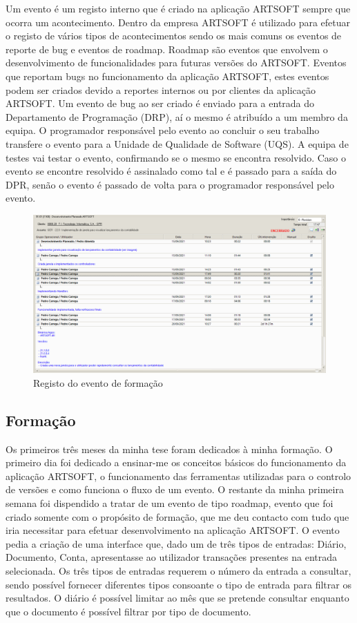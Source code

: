 \documentclass[sigplan]{acmart}
\begin{document}
Um evento é um registo interno que é criado na aplicação ARTSOFT sempre que ocorra um acontecimento. Dentro da empresa ARTSOFT é utilizado para efetuar o registo de vários tipos de acontecimentos sendo os mais comuns os eventos de reporte de bug e eventos de roadmap. Roadmap são eventos que envolvem o desenvolvimento de funcionalidades para futuras versões do ARTSOFT. Eventos que reportam bugs no funcionamento da aplicação ARTSOFT, estes eventos podem ser criados devido a reportes internos ou por clientes da aplicação ARTSOFT. Um evento de bug ao ser criado é enviado para a entrada do Departamento de Programação (DRP), aí o mesmo é atribuído a um membro da equipa. O programador responsável pelo evento ao concluir o seu trabalho transfere o evento para a Unidade de Qualidade de Software (UQS). A equipa de testes vai testar o evento, confirmando se o mesmo se encontra resolvido. Caso o evento se encontre resolvido é assinalado como tal e é passado para a saída do DPR, senão o evento é passado de volta para o programador responsável pelo evento.

\begin{figure}[htbp]
	\centerline{\includegraphics[width=\linewidth]{figures/evento_formacao.png}}
	\caption{Registo do evento de formação}
	\label{fig1}
\end{figure}

\subsection{Formação}

Os primeiros três meses da minha tese foram dedicados à minha formação. O primeiro dia foi dedicado a ensinar-me os conceitos básicos do funcionamento da aplicação ARTSOFT, o funcionamento das ferramentas utilizadas para o controlo de versões e como funciona o fluxo de um evento. O restante da minha primeira semana foi dispendido a tratar de um evento de tipo roadmap, evento que foi criado somente com o propósito de formação, que me deu contacto com tudo que iria necessitar para efetuar desenvolvimento na aplicação ARTSOFT. O evento pedia a criação de uma interface que, dado um de três tipos de entradas: Diário, Documento, Conta, apresentasse ao utilizador transações presentes na entrada selecionada. Os três tipos de entradas requerem o número da entrada a consultar, sendo possível fornecer diferentes tipos consoante o tipo de entrada para filtrar os resultados. O diário é possível limitar ao mês que se pretende consultar enquanto que o documento é possível filtrar por tipo de documento.
\end{document}

